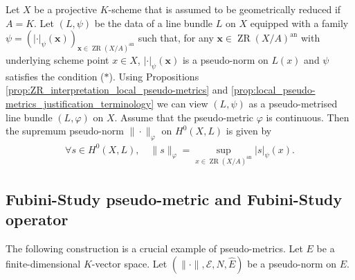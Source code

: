 \documentclass [11pt,reqno]{amsart}
\newcommand{\1}{\mathmybb{1}}
\def\cE{{\mathcal{E}}}
\def\an{\operatorname{an}}
\def\ZR{\operatorname{ZR}}
\begin{document}
\begin{remark}
\label{rem:ZR_interpretation_sup_pseudo-norm}
Let $X$ be a projective $K$-scheme that is assumed to be geometrically reduced if $A=K$. Let $(L,\psi)$ be the data of a line bundle $L$ on $X$ equipped with a family $\psi=(|\cdot|_{\psi}(\mathbf{x}))_{\mathbf{x}\in \ZR(X/A)^{\an}}$ such that, for any $\mathbf{x}\in \ZR(X/A)^{\an}$ with underlying scheme point $x\in X$, $|\cdot|_{\psi}(\mathbf{x})$ is a pseudo-norm on $L(x)$ and $\psi$ satisfies the condition ($\ast$). Using Propositions \ref{prop:ZR_interpretation_local_pseudo-metrics} and \ref{prop:local_pseudo-metrics_justification_terminology} we can view $(L,\psi)$ as a pseudo-metrised line bundle $(L,\varphi)$ on $X$. Assume that the pseudo-metric $\varphi$ is continuous. Then the supremum pseudo-norm $\|\cdot\|_{\varphi}$ on $H^{0}(X,L)$ is given by
\begin{align*}
\forall s\in H^{0}(X,L),\quad \|s\|_{\varphi} = \displaystyle\sup_{x\in \ZR(X/A)^{\an}} |s|_{\psi}(x).
\end{align*}
\end{remark}

\subsection{Fubini-Study pseudo-metric and Fubini-Study operator}
\label{sub:FS_local}

The following construction is a crucial example of pseudo-metrics. Let $E$ be a finite-dimensional $K$-vector space. Let $(\|\cdot\|,\cE,N,\widehat{E})$ be a pseudo-norm on $E$. 
\end{document}

